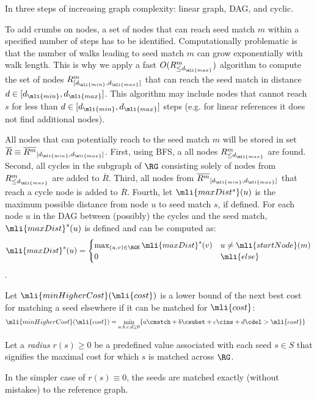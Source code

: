 In three steps of increasing graph complexity: linear graph, DAG, and cyclic.

To add crumbs on nodes, a set of nodes that can reach seed match $m$ within a
specified number of steps has to be identified. Computationally problematic is
that the number of walks leading to seed match $m$ can grow exponentially with
walk length. This is why we apply a fast $O(R^m_{\le d_\mli{max}})$ algorithm to
compute the set of nodes $R^m_{[d_\mli{min}, d_\mli{max}]}$ that can reach the
seed match in distance $d \in [d_\mli{min}, d_\mli{max}]$. This algorithm may
include nodes that cannot reach $s$ for less than $d \in [d_\mli{min},
d_\mli{max}]$ steps (e.g. for linear references it does not find additional
nodes).

All nodes that can potentially reach to the seed match $m$ will be stored in set
$\overline{R} \equiv \overline{R^m}_{[d_\mli{min},d_\mli{max}]}$. First, using
BFS, a all nodes $R^m_{\le d_\mli{max}}$ are found. Second, all cycles in the
subgraph of $\RG$ consisting solely of nodes from $R^m_{\le d_\mli{max}}$ are
added to $\overline{R}$. Third, all nodes from
$\overline{R^m}_{[d_\mli{min},d_\mli{max}]}$ that reach a cycle node is added to
$\overline{R}$. Fourth, let $\mli{maxDist^s}(u)$ is the maximum possible
distance from node $u$ to seed match $s$, if defined. For each node $u$ in the
DAG between (possibly) the cycles and the seed match, $\mli{maxDist}^s(u)$ is
defined and can be computed as:
\begin{align}
\mli{maxDist}^s(u) = 
    \begin{cases} 
        \max_{(u,v) \in \RGE}{\mli{maxDist}^s(v)} & u \neq \mli{startNode}(m) \\
        0 & \mli{else}
    \end{cases}
\end{align}.

Let $\mli{minHigherCost}(\mli{cost})$ is a lower bound of the next best cost for
matching a seed elsewhere if it can be matched for $\mli{cost}$:
\begin{align}
\mli{minHigherCost}(\mli{cost}) &= \min_{a, b, c, d \ge 0} \{ a\cmatch + b\csubst + c\cins + d\cdel > \mli{cost} \}
\end{align}

Let a \textit{radius} $r(s) \ge 0$ be a predefined value associated with each
seed \mbox{$s \in S$} that signifies the maximal cost for which $s$ is matched
across $\RG$.

In the simpler case of $r(s) \equiv 0$,
the seeds are matched exactly (without mistakes) to the reference graph.

